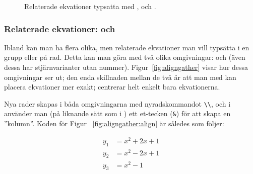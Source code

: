 \documentclass[../../a4.tex]{subfiles}
\begin{document}
\begin{figure}[b]
	\centering 
	\quad
	\caption{Relaterade ekvationer typsatta med , 
	och .}
	\label{fig:aligngather}
\end{figure}
\clearpage

\subsubsection{Relaterade ekvationer:  och }
Ibland kan man ha flera olika, men relaterade ekvationer man vill typsätta
i en grupp eller på rad. Detta kan man göra med två olika omgivningar:
 och  (även dessa har stjärnvarianter utan nummer).
Figur~\vref{fig:aligngather} visar hur dessa omgivningar ser ut; den enda
skillnaden mellan de två är att man med  kan placera ekvationer
mer exakt;  centrerar helt enkelt bara ekvationerna.

Nya rader skapas i båda omgivningarna med nyradskommandot \verb|\\|, och
i  använder man (på liknande sätt som i ) ett
et-tecken (\verb|&|) för att skapa en ”kolumn”. Koden för Figur~%
\vref{fig:aligngather:align} är således som följer:
\begin{latexcode}
\begin{align}
y_1 &= x^2 + 2x + 1 \\
y_2 &= x^2 - 2x + 1 \\
y_3 &= x^2 - 1
\end{align}
\end{latexcode}
\end{document}
